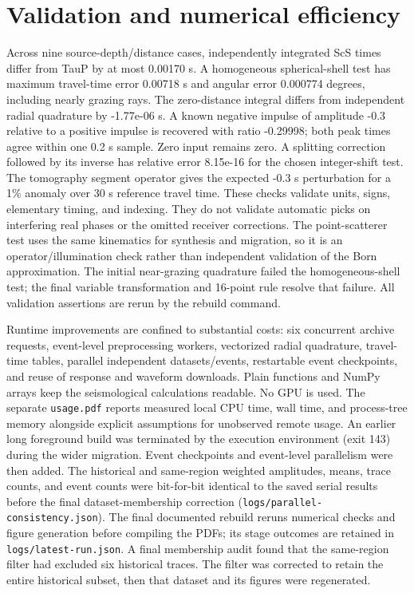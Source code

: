 \documentclass[10pt]{article}
\begin{document}
\section{Validation and numerical efficiency}
Across nine source-depth/distance cases, independently integrated ScS times differ from TauP by at most 0.00170 s. A homogeneous spherical-shell test has maximum travel-time error 0.00718 s and angular error 0.000774 degrees, including nearly grazing rays. The zero-distance integral differs from independent radial quadrature by -1.77e-06 s.
A known negative impulse of amplitude -0.3 relative to a positive impulse is recovered with ratio -0.29998; both peak times agree within one 0.2 s sample. Zero input remains zero. A splitting correction followed by its inverse has relative error 8.15e-16 for the chosen integer-shift test. The tomography segment operator gives the expected -0.3 s perturbation for a 1\% anomaly over 30 s reference travel time.
These checks validate units, signs, elementary timing, and indexing. They do not
validate automatic picks on interfering real phases or the omitted receiver
corrections. The point-scatterer test uses the same kinematics for synthesis and
migration, so it is an operator/illumination check rather than independent
validation of the Born approximation. The initial near-grazing quadrature failed
the homogeneous-shell test; the final variable transformation and 16-point rule
resolve that failure. All validation assertions are rerun by the rebuild command.

Runtime improvements are confined to substantial costs: six concurrent archive
requests, event-level preprocessing workers, vectorized radial quadrature,
travel-time tables, parallel independent datasets/events, restartable event checkpoints,
and reuse of response and waveform downloads. Plain functions
and NumPy arrays keep the seismological calculations readable. No GPU is used.
The separate \texttt{usage.pdf} reports measured local CPU time, wall time, and
process-tree memory alongside explicit assumptions for unobserved remote usage.
An earlier long foreground build was terminated by the execution environment
(exit 143) during the wider migration. Event checkpoints and event-level
parallelism were then added. The historical and same-region weighted amplitudes,
means, trace counts, and event counts were bit-for-bit identical to the saved
serial results before the final dataset-membership correction (\texttt{logs/parallel-consistency.json}). The final documented
rebuild reruns numerical checks and figure generation before compiling the PDFs;
its stage outcomes are retained in \texttt{logs/latest-run.json}. A final membership
audit found that the same-region filter had excluded six historical traces. The
filter was corrected to retain the entire historical subset, then that dataset
and its figures were regenerated.
\end{document}
